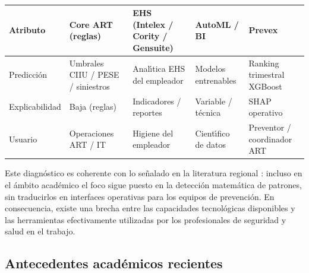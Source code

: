 

\begin{table}[htbp]
	\centering
	\caption{ \fuentepropia}
	\label{tab:benchmark-comercial}
	\begin{tabular}{@{}p{}p{}p{}p{}p{}@{}}
		\hline
		\textbf{Atributo} & \textbf{Core ART (reglas)} & \textbf{EHS (Intelex / Cority / Gensuite)} & \textbf{AutoML / BI} & \textbf{Prevex} \\
		\hline
		Predicci\'on & Umbrales CIIU / PESE / siniestros & Anal\'{\i}tica EHS del empleador & Modelos entrenables & Ranking trimestral XGBoost \\
		Explicabilidad & Baja (reglas) & Indicadores / reportes & Variable / t\'ecnica & SHAP operativo \\
		Usuario & Operaciones ART / IT & Higiene del empleador & Cient\'{\i}fico de datos & Preventor / coordinador ART \\
		\hline
	\end{tabular}
\end{table}

Este diagn\'ostico es coherente con lo se\~nalado en la literatura regional \parencite{zamora2024}: incluso en el \'ambito acad\'emico el foco sigue puesto en la detecci\'on matem\'atica de patrones, sin traducirlos en interfaces operativas para los equipos de prevenci\'on. En consecuencia, existe una brecha entre las capacidades tecnol\'ogicas disponibles y las herramientas efectivamente utilizadas por los profesionales de seguridad y salud en el trabajo.

\subsection{Antecedentes acad\'emicos recientes}

